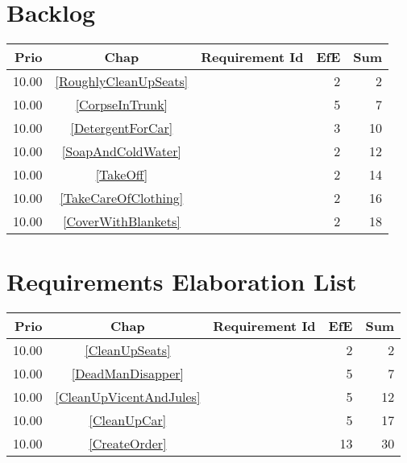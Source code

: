 \section{Backlog}
\begin{longtable}{|r|c|p{7cm}||r|r|} \hline
\textbf{Prio} & \textbf{Chap} & \textbf{Requirement Id} & \textbf{EfE} & \textbf{Sum} \\ \hline\endhead
10.00 & \ref{RoughlyCleanUpSeats} & \nameref{RoughlyCleanUpSeats} & 2 & 2 \\ \hline
10.00 & \ref{CorpseInTrunk} & \nameref{CorpseInTrunk} & 5 & 7 \\ \hline
10.00 & \ref{DetergentForCar} & \nameref{DetergentForCar} & 3 & 10 \\ \hline
10.00 & \ref{SoapAndColdWater} & \nameref{SoapAndColdWater} & 2 & 12 \\ \hline
10.00 & \ref{TakeOff} & \nameref{TakeOff} & 2 & 14 \\ \hline
10.00 & \ref{TakeCareOfClothing} & \nameref{TakeCareOfClothing} & 2 & 16 \\ \hline
10.00 & \ref{CoverWithBlankets} & \nameref{CoverWithBlankets} & 2 & 18 \\ \hline
\end{longtable}\section{Requirements Elaboration List}
\begin{longtable}{|r|c|p{7cm}||r|r|} \hline
\textbf{Prio} & \textbf{Chap} & \textbf{Requirement Id} & \textbf{EfE} & \textbf{Sum} \\ \hline\endhead
10.00 & \ref{CleanUpSeats} & \nameref{CleanUpSeats} & 2 & 2 \\ \hline
10.00 & \ref{DeadManDisapper} & \nameref{DeadManDisapper} & 5 & 7 \\ \hline
10.00 & \ref{CleanUpVicentAndJules} & \nameref{CleanUpVicentAndJules} & 5 & 12 \\ \hline
10.00 & \ref{CleanUpCar} & \nameref{CleanUpCar} & 5 & 17 \\ \hline
10.00 & \ref{CreateOrder} & \nameref{CreateOrder} & 13 & 30 \\ \hline
\end{longtable}